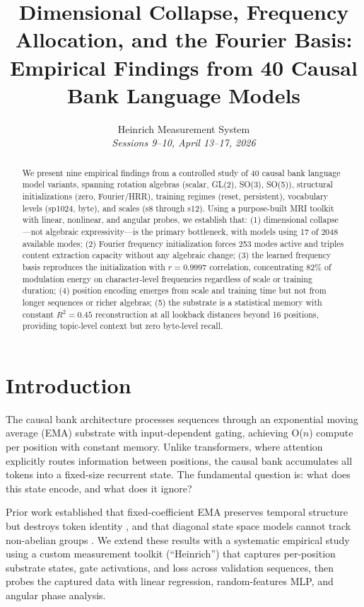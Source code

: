 \documentclass[11pt,a4paper]{article}
\title{Dimensional Collapse, Frequency Allocation, and the Fourier Basis:\\Empirical Findings from 40 Causal Bank Language Models}
\author{Heinrich Measurement System \\ \textit{Sessions 9--10, April 13--17, 2026}}
\date{}
\begin{document}
\maketitle

\begin{abstract}
We present nine empirical findings from a controlled study of 40 causal bank language model variants, spanning rotation algebras (scalar, GL(2), SO(3), SO(5)), structural initializations (zero, Fourier/HRR), training regimes (reset, persistent), vocabulary levels (sp1024, byte), and scales (s8 through s12). Using a purpose-built MRI toolkit with linear, nonlinear, and angular probes, we establish that: (1) dimensional collapse---not algebraic expressivity---is the primary bottleneck, with models using 17 of 2048 available modes; (2) Fourier frequency initialization forces 253 modes active and triples content extraction capacity without any algebraic change; (3) the learned frequency basis reproduces the initialization with $r = 0.9997$ correlation, concentrating 82\% of modulation energy on character-level frequencies regardless of scale or training duration; (4) position encoding emerges from scale and training time but not from longer sequences or richer algebras; (5) the substrate is a statistical memory with constant $R^2 = 0.45$ reconstruction at all lookback distances beyond 16 positions, providing topic-level context but zero byte-level recall.
\end{abstract}

\section{Introduction}

The causal bank architecture processes sequences through an exponential moving average (EMA) substrate with input-dependent gating, achieving O($n$) compute per position with constant memory. Unlike transformers, where attention explicitly routes information between positions, the causal bank accumulates all tokens into a fixed-size recurrent state. The fundamental question is: what does this state encode, and what does it ignore?

Prior work established that fixed-coefficient EMA preserves temporal structure but destroys token identity \cite{ema_not_all}, and that diagonal state space models cannot track non-abelian groups \cite{diagonal_ssm_limits}. We extend these results with a systematic empirical study using a custom measurement toolkit (``Heinrich'') that captures per-position substrate states, gate activations, and loss across validation sequences, then probes the captured data with linear regression, random-features MLP, and angular phase analysis.
\end{document}

